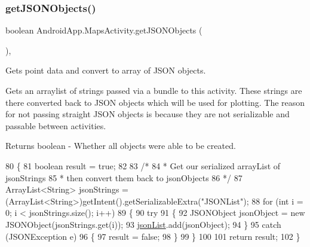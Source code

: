 \subsubsection{\texorpdfstring{get\+J\+S\+O\+N\+Objects()}{getJSONObjects()}}
{\footnotesize\ttfamily boolean Android\+App.\+Maps\+Activity.\+get\+J\+S\+O\+N\+Objects (\begin{DoxyParamCaption}{ }\end{DoxyParamCaption})\hspace{0.3cm}{\ttfamily [inline]}, {\ttfamily [private]}}



Gets point data and convert to array of J\+S\+ON objects. 

Gets an arraylist of strings passed via a bundle to this activity. These strings are there converted back to J\+S\+ON objects which will be used for plotting. The reason for not passing straight J\+S\+ON objects is because they are not serializable and passable between activities.

\begin{DoxyReturn}{Returns}
boolean -\/ Whether all objects were able to be created. 
\end{DoxyReturn}

\begin{DoxyCode}
80     \{
81         \textcolor{keywordtype}{boolean} result = \textcolor{keyword}{true};
82 
83         \textcolor{comment}{/*}
84 \textcolor{comment}{         * Get our serialized arrayList of jsonStrings}
85 \textcolor{comment}{         * then convert them back to jsonObjects}
86 \textcolor{comment}{         */}
87         ArrayList<String> jsonStrings = (ArrayList<String>)getIntent().getSerializableExtra(\textcolor{stringliteral}{"JSONList"});
88         \textcolor{keywordflow}{for} (\textcolor{keywordtype}{int} i = 0; i < jsonStrings.size(); i++)
89         \{
90             \textcolor{keywordflow}{try}
91             \{
92                 JSONObject jsonObject = \textcolor{keyword}{new} JSONObject(jsonStrings.get(i));
93                 \hyperlink{class_android_app_1_1_maps_activity_a5ff2abfd342648b27a17551d5bd668ac}{jsonList}.add(jsonObject);
94             \}
95             \textcolor{keywordflow}{catch} (JSONException e)
96             \{
97                 result = \textcolor{keyword}{false};
98             \}
99         \}
100 
101         \textcolor{keywordflow}{return} result;
102     \}
\end{DoxyCode}
\mbox{\label{class_android_app_1_1_maps_activity_a18364d9334710362b1e6c39502353927}} 
